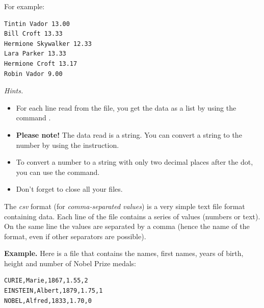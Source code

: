 \documentclass[11pt,class=report,crop=false]{standalone}
\begin{document}
\begin{activite}
\begin{enumerate}
For example:  
\begin{center}
\begin{minipage}{0.5\textwidth}
\begin{lstlisting}
Tintin Vador 13.00
Bill Croft 13.33
Hermione Skywalker 12.33
Lara Parker 13.33
Hermione Croft 13.17
Robin Vador 9.00
\end{lstlisting}
\end{minipage}
\end{center}   
  

%    

  \emph{Hints.}
  \begin{itemize}
    	\item For each line read from the  file, you get the data as a list by using the command .
    	
    	\item \textbf{Please note!} The data read is a string. You can convert a string  to the number  by using the  instruction.
    	
    	\item To convert a number to a string with only two decimal places after the dot, you can use the  command.
    	
    	\item Don't forget to close all your files.
    	
   \end{itemize}
    
\end{enumerate}   
     
\end{activite}



\begin{cours}
The \emph{csv} format (for \emph{comma-separated values}) is a very simple text file format containing data.
Each line of the file contains a series of values (numbers or text). On the same line the values are separated by a comma (hence the name of the format, even if other separators are possible).

\medskip

\textbf{Example.} Here is a file that contains the names, first names, years of birth, height and number of Nobel Prize medals:
\begin{center}
\begin{minipage}{0.4\textwidth}
\begin{lstlisting}
CURIE,Marie,1867,1.55,2
EINSTEIN,Albert,1879,1.75,1
NOBEL,Alfred,1833,1.70,0
\end{lstlisting}
\end{minipage}
\end{center}

\end{cours}
\end{document}
